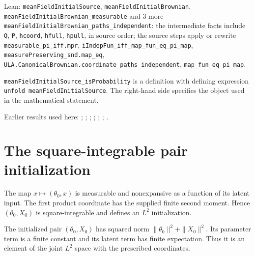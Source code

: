 \documentclass[11pt,a4paper]{article}
\begin{document}
\begin{leanbox}{Lean: \texttt{meanFieldInitialSource}, \texttt{meanFieldInitialBrownian}, \texttt{meanFieldInitialBrownian\_\allowbreak{}measurable} and 3 more}
\texttt{mean\allowbreak{}Field\allowbreak{}Initial\allowbreak{}Brownian\_\allowbreak{}paths\_\allowbreak{}independent}: the intermediate facts include \texttt{Q}, \texttt{P}, \texttt{hcoord}, \texttt{hfull}, \texttt{hpull}, in source order; the source steps apply or rewrite \texttt{measurable\_\allowbreak{}pi\_\allowbreak{}iff.\allowbreak{}mpr}, \texttt{i\allowbreak{}Indep\allowbreak{}Fun\_\allowbreak{}iff\_\allowbreak{}map\_\allowbreak{}fun\_\allowbreak{}eq\_\allowbreak{}pi\_\allowbreak{}map}, \texttt{measure\allowbreak{}Preserving\_\allowbreak{}snd.\allowbreak{}map\_\allowbreak{}eq}, \texttt{ULA.\allowbreak{}Canonical\allowbreak{}Brownian.\allowbreak{}coordinate\_\allowbreak{}paths\_\allowbreak{}independent}, \texttt{map\_\allowbreak{}fun\_\allowbreak{}eq\_\allowbreak{}pi\_\allowbreak{}map}.



\texttt{mean\allowbreak{}Field\allowbreak{}Initial\allowbreak{}Source\_\allowbreak{}is\allowbreak{}Probability} is a definition with defining expression \texttt{unfold mean\allowbreak{}Field\allowbreak{}Initial\allowbreak{}Source}. The right-hand side specifies the object used in the mathematical statement.
\end{leanbox}


Earlier results used here: \cite[Section~3.32.1]{LangevinLean2026ULASC}; \cite[Section~3.8.11]{LangevinLean2026ULASC}; \cite[Section~3.8.16]{LangevinLean2026ULASC}; \cite[Section~3.8.17]{LangevinLean2026ULASC}; \cite[Section~3.8.19]{LangevinLean2026ULASC}; \cite[Section~3.8.20]{LangevinLean2026ULASC}; \cite[Section~3.8.21]{LangevinLean2026ULASC}.

\section{\texorpdfstring{The square-integrable pair initialization}{The square-integrable pair initialization}}


The map \(x\mapsto(\theta_0,x)\) is measurable and nonexpansive as a function of its latent input. The first product coordinate has the supplied finite second moment. Hence \((\theta_0,X_0)\) is square-integrable and defines an \(L^2\) initialization.



The initialized pair \((\theta_0,X_0)\) has squared norm \(\|\theta_0\|^2+\|X_0\|^2\). Its parameter term is a finite constant and its latent term has finite expectation. Thus it is an element of the joint \(L^2\) space with the prescribed coordinates.
\end{document}
